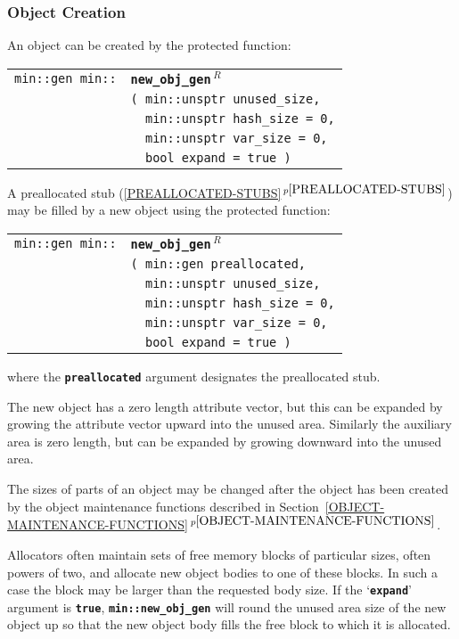 \documentclass[12pt]{article}
\makeatletter
\newcommand{\TT}[1]{{\tt \bfseries #1}}
\newcommand{\ttindex}[1]{\index{#1@{\tt #1}}}
\newcommand{\itemref}[1]{\ref{#1}$\,^{p\pageref{#1}}$}
\newcommand{\EOL}{\penalty \exhyphenpenalty}
\newenvironment{indpar}[1][0.3in]%
	{\begin{list}{}%
		     {\setlength{\itemsep}{0in}%
		      \setlength{\topsep}{0in}%
		      \setlength{\parsep}{1ex}%
		      \setlength{\labelwidth}{#1}%
		      \setlength{\leftmargin}{#1}%
		      \addtolength{\leftmargin}{\labelsep}}%
	 \item}%
	{\end{list}}
\newcommand{\LABEL}[1]{\label{#1}}
\newlength{\ARGBREAKLENGTH}
\newcommand{\ARGBREAK}[1][\ARGBREAKLENGTH]{\\&\hspace*{#1}}
\newcommand{\MINKEY}[1]%
	   {\TT{#1}\ttindex{min::#1}\ttindex{#1}}
\newcommand{\REL}{$\,^R$}
\makeatother
\begin{document}
\subsubsection{Object Creation}
\label{OBJECT-CREATION}

An object can be created by the protected function:

\begin{indpar}\begin{tabular}{r@{}l}
\verb|min::gen min::| & \MINKEY{new\_obj\_gen\REL}\ARGBREAK
    \verb|( min::unsptr unused_size,|\ARGBREAK
    \verb|  min::unsptr hash_size = 0,|\ARGBREAK
    \verb|  min::unsptr var_size = 0,|\ARGBREAK
    \verb|  bool expand = true )|
\LABEL{MIN::NEW_OBJ_GEN} \\
\end{tabular}\end{indpar}

A preallocated stub (\itemref{PREALLOCATED-STUBS})
may be filled by a new object using the protected function:
\begin{indpar}\begin{tabular}{r@{}l}
\verb|min::gen min::| & \MINKEY{new\_obj\_gen\REL}\ARGBREAK
    \verb|( min::gen preallocated,|\ARGBREAK
    \verb|  min::unsptr unused_size,|\ARGBREAK
    \verb|  min::unsptr hash_size = 0,|\ARGBREAK
    \verb|  min::unsptr var_size = 0,|\ARGBREAK
    \verb|  bool expand = true )|
\LABEL{MIN::PREALLOCATED_NEW_OBJ_GEN} \\
\end{tabular}\end{indpar}
where the \TT{preallocated} argument designates the preallocated stub.

The new object has a zero length attribute vector, but this can be
expanded by growing the attribute vector upward into the unused area.
Similarly the auxiliary area is zero length, but can be expanded by
growing downward into the unused area.

The sizes of parts of an object may be changed after the object has
been created by the object maintenance functions
described in Section~\itemref{OBJECT-MAINTENANCE-FUNCTIONS}.

Allocators often maintain sets of free memory blocks of particular
sizes, often powers of two, and allocate new object bodies to one
of these blocks.  In such a case the block may be larger than the
requested body size.  If the `\TT{expand}' argument is \TT{true},
\TT{min::\EOL new\_\EOL obj\_\EOL gen} will round the unused area
size of the new object up so that the new object body fills the
free block to which it is allocated.
\end{document}
